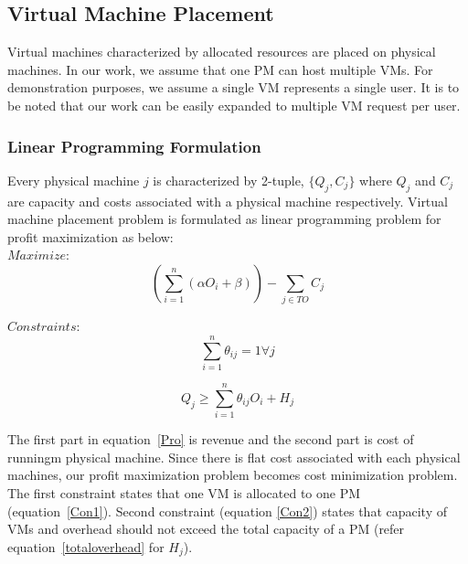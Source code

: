 \subsection{Virtual Machine Placement}
 Virtual machines characterized by allocated resources are placed on physical machines. In our work, we assume that one PM can host multiple VMs. For demonstration purposes, we assume a single VM represents a single user. It is to be noted that our work can be easily expanded to multiple VM request per user.
\subsubsection{Linear Programming Formulation}
Every physical machine $j$ is characterized by 2-tuple, $\{Q_j,C_j\}$ where $Q_j$ and $C_j$ are capacity and costs associated with a physical machine respectively. Virtual machine placement problem is formulated as linear programming problem for profit maximization as below: \\


$Maximize:$
\begin{equation}
\label{Pro}{(\sum_{i=1}^n (\alpha O_i+\beta))-\sum_{j\in TO} C_j }
\end{equation}

$Constraints:$
\begin{equation}
\label{Con1}
\sum_{i=1}^n\theta_{ij}=1 \forall j
\end{equation}

\begin{equation}
\label{Con2}
Q_j\geqslant \sum_{i=1}^n\theta_{ij} O_i+H_j
\end{equation}

The first part in equation~\ref{Pro} is revenue and the second part is cost of runningm physical machine. Since there is flat cost associated with each physical machines, our profit maximization problem becomes cost minimization problem. 
The first constraint states that one VM is allocated to one PM (equation~\ref{Con1}). Second constraint (equation \ref{Con2}) states that capacity of VMs and overhead should not exceed the total capacity of a PM (refer equation~\ref{totaloverhead} for $H_j$). 



